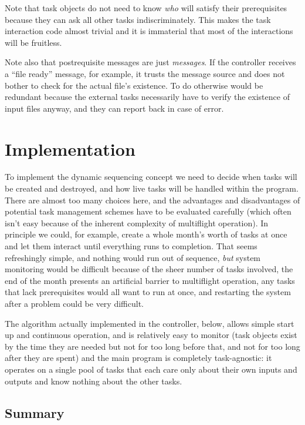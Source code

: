 \documentclass[12pt]{amsart}
\begin{document}
Note that task objects do not need to know {\em who} will satisfy their
prerequisites because they can ask all other tasks indiscriminately.
This makes the task interaction code almost trivial and it is immaterial
that most of the interactions will be fruitless. 

Note also that postrequisite messages are just {\em messages}. If the
controller receives a ``file ready'' message, for example, it trusts the
message source and does not bother to check for the actual file's
existence. To do otherwise would be redundant because the external tasks
necessarily have to verify the existence of input files anyway, and they
can report back in case of error.


\section{Implementation}

To implement the dynamic sequencing concept we need to decide when tasks
will be created and destroyed, and how live tasks will be handled within
the program.  There are almost too many choices here, and the advantages
and disadvantages of potential task management schemes have to be
evaluated carefully (which often isn't easy because of the inherent
complexity of multiflight operation). In principle we could, for
example, create a whole month's worth of tasks at once and let them
interact until everything runs to completion.  That seems refreshingly
simple, and nothing would run out of sequence, {\em but} system
monitoring would be difficult because of the sheer number of tasks
involved, the end of the month presents an artificial barrier to
multiflight operation, any tasks that lack prerequisites would all want
to run at once, and restarting the system after a problem could be very
difficult. 

The algorithm actually implemented in the controller, below, allows
simple start up and continuous operation, and is relatively easy to
monitor (task objects exist by the time they are needed but not for too
long before that, and not for too long after they are spent) and the
main program is completely task-agnostic: it operates on a single pool
of tasks that each care only about their own inputs and outputs and
know nothing about the other tasks.  

\subsection{Summary}
\end{document}
